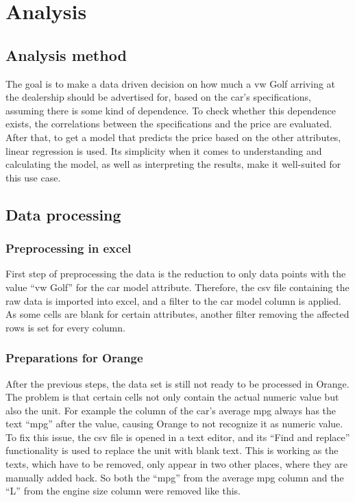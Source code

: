 \chapter{Analysis}
\section{Analysis method}
The goal is to make a data driven decision on how much a \ac{vw} Golf arriving at the dealership should be advertised for,
based on the car's specifications, assuming there is some kind of dependence.
To check whether this dependence exists, the correlations between the specifications and the price are evaluated.
After that, to get a model that predicts the price based on the other attributes, linear regression is used.
Its simplicity when it comes to understanding and calculating the model, as well as interpreting the results, make it well-suited
for this use case.    

\section{Data processing}
\subsection{Preprocessing in \ac{excel}}
First step of preprocessing the data is the reduction to only data points with the value \enquote{\ac{vw} Golf} for the car model attribute. Therefore, the \ac{csv} file containing the raw data is
imported into \ac{excel}, and a filter to the car model column is applied. As some cells are blank for certain attributes, another filter removing the affected rows is set for every column. 

\subsection{Preparations for Orange}
After the previous steps, the data set is still not ready to be processed in Orange. The problem is that certain cells not only contain the actual numeric value but also the 
unit. For example the column of the car's average \ac{mpg} always has the text \enquote{mpg} after the value, causing Orange to not recognize it as 
numeric value. To fix this issue, the \ac{csv} file is opened in a text editor, and its \enquote{Find and replace} functionality is used to replace the unit with blank text.
This is working as the texts,
which have to be removed, only appear in two other places, where they are manually added back. So both the \enquote{mpg} from the average \ac{mpg} column and the \enquote{L}
from the engine size column were removed like this.

